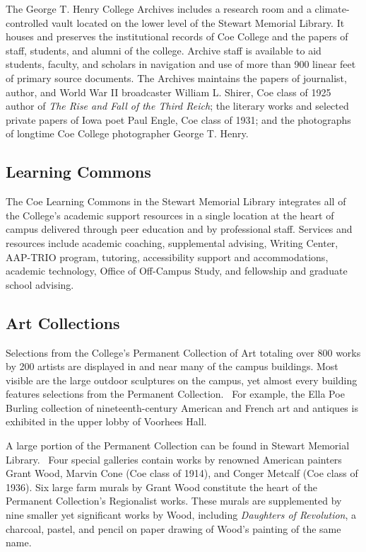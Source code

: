 \documentclass[
  letterpaper,
]{scrbook}
\begin{document}
The George T. Henry College Archives includes a research room and a
climate-controlled vault located on the lower level of the Stewart
Memorial Library. It houses and preserves the institutional records of
Coe College and the papers of staff, students, and alumni of the
college. Archive staff is available to aid students, faculty, and
scholars in navigation and use of more than 900 linear feet of primary
source documents. The Archives maintains the papers of journalist,
author, and World War II broadcaster William L. Shirer, Coe class of
1925 author of \emph{The Rise and Fall of the Third Reich}; the literary
works and selected private papers of Iowa poet Paul Engle, Coe class of
1931; and the photographs of longtime Coe College photographer George T.
Henry.

\subsection{Learning Commons}\label{learning-commons}

The Coe Learning Commons in the Stewart Memorial Library integrates all
of the College's academic support resources in a single location at the
heart of campus delivered through peer education and by professional
staff. Services and resources include academic coaching, supplemental
advising, Writing Center, AAP-TRIO program, tutoring, accessibility
support and accommodations, academic technology, Office of Off-Campus
Study, and fellowship and graduate school advising.

\subsection{Art Collections}\label{art-collections}

Selections from the College's Permanent Collection of Art totaling over
800 works by 200 artists are displayed in and near many of the campus
buildings. Most visible are the large outdoor sculptures on the campus,
yet almost every building features selections from the Permanent
Collection.~ For example, the Ella Poe Burling collection of
nineteenth-century American and French art and antiques is exhibited in
the upper lobby of Voorhees Hall.

A large portion of the Permanent Collection can be found in Stewart
Memorial Library.~ Four special galleries contain works by renowned
American painters Grant Wood, Marvin Cone (Coe class of 1914), and
Conger Metcalf (Coe class of 1936). Six large farm murals by Grant Wood
constitute the heart of the Permanent Collection's Regionalist works.
These murals are supplemented by nine smaller yet significant works by
Wood, including \emph{Daughters of Revolution}, a charcoal, pastel, and
pencil on paper drawing of Wood's painting of the same name.
\end{document}
